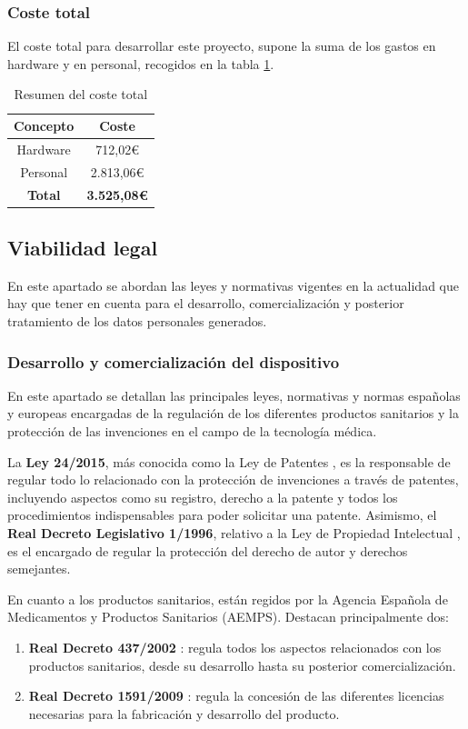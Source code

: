 \subsubsection{Coste total}
El coste total para desarrollar este proyecto, supone la suma de los gastos en hardware y en personal, recogidos en la tabla \ref{tab:costes-total}.

\begin{table}[h!]
\centering
\begin{tabular}{ |c|c| }
\hline
\rowcolor[HTML]{B0E0E6} 
\textbf{Concepto} & \textbf{Coste} \\
\hline
Hardware & 712,02€ \\
\hline
Personal & 2.813,06€ \\
\rowcolor[HTML]{4682B4} 
\textbf{Total} & \textbf{3.525,08€} \\
\hline
\end{tabular}
\caption{Resumen del coste total}
\label{tab:costes-total}
\end{table}

\subsection{Viabilidad legal}
En este apartado se abordan las leyes y normativas vigentes en la actualidad que hay que tener en cuenta para el desarrollo, comercialización y posterior tratamiento de los datos personales generados.

\subsubsection{Desarrollo y comercialización del dispositivo}
En este apartado se detallan las principales leyes, normativas y normas españolas y europeas encargadas de la regulación de los diferentes productos sanitarios y la protección de las invenciones en el campo de la tecnología médica.


La \textbf{Ley 24/2015}, más conocida como la Ley de Patentes \cite{patentes}, es la responsable de regular todo lo relacionado con la protección de invenciones a través de patentes, incluyendo aspectos como su registro, derecho a la patente y todos los procedimientos indispensables para poder solicitar una patente. Asimismo, el \textbf{Real Decreto Legislativo 1/1996}, relativo a la Ley de Propiedad Intelectual \cite{propintec}, es el encargado de regular la protección del derecho de autor y derechos semejantes.

En cuanto a los productos sanitarios, están regidos por la Agencia Española de Medicamentos y Productos Sanitarios (AEMPS). Destacan principalmente dos:
\begin{enumerate}
    \item \textbf{Real Decreto 437/2002} \cite{licencias}: regula todos los aspectos relacionados con los productos sanitarios, desde su desarrollo hasta su posterior comercialización.
    \item \textbf{Real Decreto 1591/2009} \cite{prod}: regula la concesión de las diferentes licencias necesarias para la fabricación y desarrollo del producto.
\end{enumerate}

